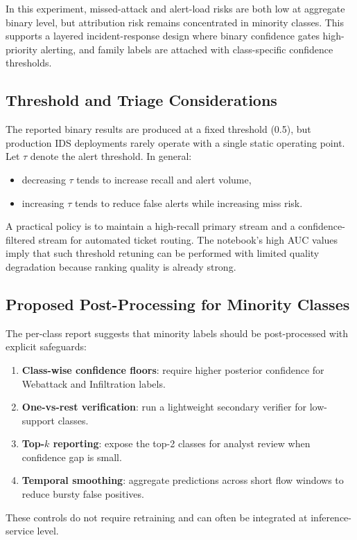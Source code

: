 \documentclass[10pt,journal]{IEEEtran}
\begin{document}
In this experiment, missed-attack and alert-load risks are both low at aggregate binary level, but attribution risk remains concentrated in minority classes. This supports a layered incident-response design where binary confidence gates high-priority alerting, and family labels are attached with class-specific confidence thresholds.

\subsection{Threshold and Triage Considerations}
The reported binary results are produced at a fixed threshold (0.5), but production IDS deployments rarely operate with a single static operating point. Let $\tau$ denote the alert threshold. In general:
\begin{itemize}
\item decreasing $\tau$ tends to increase recall and alert volume,
\item increasing $\tau$ tends to reduce false alerts while increasing miss risk.
\end{itemize}

A practical policy is to maintain a high-recall primary stream and a confidence-filtered stream for automated ticket routing. The notebook's high AUC values imply that such threshold retuning can be performed with limited quality degradation because ranking quality is already strong.

\subsection{Proposed Post-Processing for Minority Classes}
The per-class report suggests that minority labels should be post-processed with explicit safeguards:
\begin{enumerate}
\item \textbf{Class-wise confidence floors}: require higher posterior confidence for Webattack and Infiltration labels.
\item \textbf{One-vs-rest verification}: run a lightweight secondary verifier for low-support classes.
\item \textbf{Top-$k$ reporting}: expose the top-2 classes for analyst review when confidence gap is small.
\item \textbf{Temporal smoothing}: aggregate predictions across short flow windows to reduce bursty false positives.
\end{enumerate}

These controls do not require retraining and can often be integrated at inference-service level.
\end{document}

